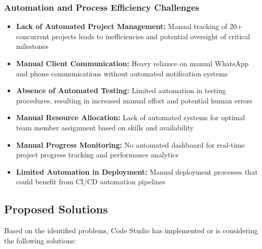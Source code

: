 \documentclass[12pt,a4paper]{article}
\begin{document}
\subsubsection{Automation and Process Efficiency Challenges}
\begin{itemize}
    \item \textbf{Lack of Automated Project Management:} Manual tracking of 20+ concurrent projects leads to inefficiencies and potential oversight of critical milestones
    \item \textbf{Manual Client Communication:} Heavy reliance on manual WhatsApp and phone communications without automated notification systems
    \item \textbf{Absence of Automated Testing:} Limited automation in testing procedures, resulting in increased manual effort and potential human errors
    \item \textbf{Manual Resource Allocation:} Lack of automated systems for optimal team member assignment based on skills and availability
    \item \textbf{Manual Progress Monitoring:} No automated dashboard for real-time project progress tracking and performance analytics
    \item \textbf{Limited Automation in Deployment:} Manual deployment processes that could benefit from CI/CD automation pipelines
\end{itemize}

\subsection{Proposed Solutions}
Based on the identified problems, Code Studio has implemented or is considering the following solutions:
\end{document}
